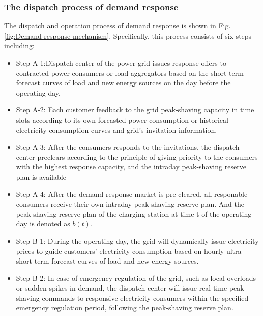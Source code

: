 \documentclass[preprint,12pt]{elsarticle}
\begin{document}
\subsubsection{The dispatch process of demand response}
The dispatch and operation process of demand response is shown in  Fig. \ref{fig:Demand-response-mechanism}. Specifically, this process consists of six steps including:
\begin{itemize}
    \item Step A-1:Dispatch center of the power grid issues response offers to contracted power consumers or load aggregators based on the short-term forecast curves of load and new energy sources on the day before the operating day.
    \item Step A-2: Each customer feedback to the grid peak-shaving capacity in time slots according to its own forcasted power consumption or historical electricity consumption curves and grid's invitation information. 
    \item Step A-3: After the consumers responds to the invitations, the dispatch center preclears according to the principle of giving priority to the consumers with the highest response capacity, and the intraday peak-shaving reserve plan is available
    \item Step A-4: After the demand response market is pre-cleared, all responable consumers receive their own intraday peak-shaving reserve plan. And the peak-shaving reserve plan of the charging station at time t of the operating day is denoted as $b(t)$.
    \item Step B-1: During the operating day, the grid will dynamically issue electricity prices to guide customers' electricity consumption based on hourly ultra-short-term forecast curves of load and new energy sources. 
    \item Step B-2: In case of emergency regulation of the grid, such as local overloads or sudden spikes in demand, the dispatch center will issue real-time peak-shaving commands to responsive electricity consumers within the specified emergency regulation period, following the peak-shaving reserve plan.
\end{itemize}
\end{document}
